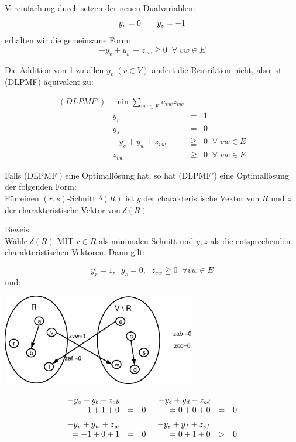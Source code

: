 Vereinfachung durch setzen der neuen Dualvariablen:
\[ y_{r}=0 \hspace{7mm} y_{s} = -1\]
erhalten wir die gemeinsame Form:
\[ -y_{v} + y_{w} + z_{v w} \geqq 0 \; \; \forall \; v w \in E\]

Die Addition von 1 zu allen $y_{v} \; (v \in V)$ ändert die Restriktion
nicht, also ist (DLPMF) äquivalent zu:

\[\begin{array}{lrcl}
(DLPMF')& \min \displaystyle \sum_{v w \in E} u_{v w} z_{v w}\\
&y_{r} &=& 1\\
&y_{s} &=& 0\\
&-y_{v} + y_{w} + z_{v w} &\geqq& 0 \; \;  \forall \; v w \in E\\
&z_{v w} &\geqq & 0 \; \; \forall \; v w \in E
\end{array}\]

\begin{satz}
Falls (DLPMF') eine Optimallösung hat, so hat (DLPMF') eine Optimallösung
 der folgenden Form:\\
Für einen $(r,s)$-Schnitt $\delta(R)$ ist $y$ der charakteristische Vektor
von $R$ und $z$ der charakteristische Vektor von $\delta(R)$
\end{satz}

Beweis:\\
Wähle $\delta(R)$ MIT $r \in R$ als minimalen Schnitt und $y,z$ als die
entsprechenden charakteristischen Vektoren. Dann gilt:

\[ y_{r} = 1, \; \; y_{s} = 0, \; \; z_{v w } \geqq 0 \; \; \forall v w
\in E\]
und:

\includegraphics[height=4cm]{bilder/3-0DLPMF}

\[\begin{array}{rcl@{\hspace{5mm}}rcl}-y_{a }- y_{b} + z_{a b}&&&
-y_{c} + y_{d} - z_{c d}\\
-1 + 1 +0 &=&0&=0+0+0&=&0\vspace{2mm}\\
-y_{v}+y_{w}+z_{w}&&&-y_{e}+y_{f}+z_{e f}\\
=-1+0+1&=&0&=0+1+0&>&0\\
\end{array}\]

